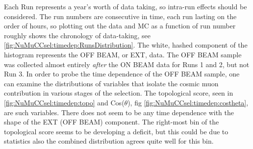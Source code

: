 \par Each Run represents a year's worth of data taking, so intra-run effects should be considered. The run numbers are consecutive in time, each run lasting on the order of hours, so plotting out the data and MC as a function of run number roughly shows the chronology of data-taking, see \cref{fig:NuMuCCsel:timedep:RunsDistribution}. The white, hashed component of the histogram represents the OFF BEAM, or EXT, data. The OFF BEAM sample was collected almost entirely \textit{after} the ON BEAM data for Runs 1 and 2, but not Run 3. In order to probe the time dependence of the OFF BEAM sample, one can examine the distributions of variables that isolate the cosmic muon contribution in various stages of the selection. The topological score, seen in \cref{fig:NuMuCCsel:timedep:topo} and Cos($\theta$), fig \ref{fig:NuMuCCsel:timedep:costheta}, are such variables. There does not seem to be any time dependence with the shape of the EXT (OFF BEAM) component. The right-most bin of the topological score seems to be developing a deficit, but this could be due to statistics also the combined distribution agrees quite well for this bin.

